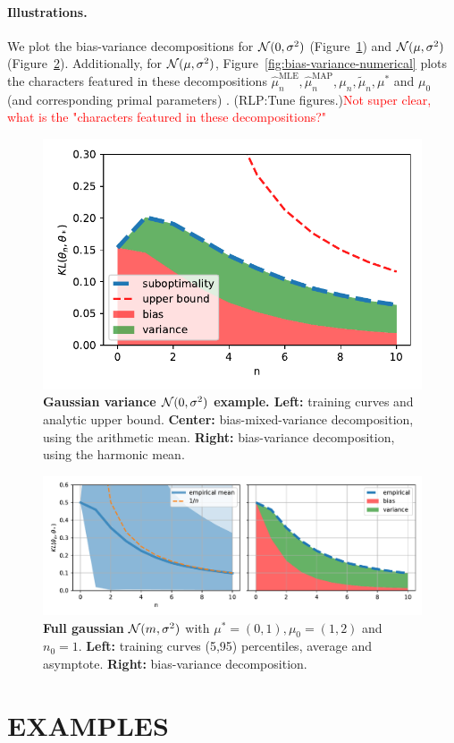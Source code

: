 \documentclass[twoside]{article}
\let\oldsection\section
\renewcommand{\section}[1]{\oldsection{\texorpdfstring{\uppercase{#1}}{#1}}}
\newcommand{\rlp}[1]{\textcolor{BrickRed}{(RLP:#1)}}
\newcommand{\m}{\mu}
\newcommand{\meanp}{\m}
\begin{document}
\paragraph{Illustrations.}
We plot the bias-variance decompositions for ${\mathcal N}(0,\sigma^2)$ (Figure~\ref{fig:variance_decomposition}) and  ${\mathcal N}(\mu, \sigma^2)$ (Figure~\ref{fig:gaussian_decomposition}).
Additionally,  for ${\mathcal N}(\mu, \sigma^2)$, Figure~\ref{fig:bias-variance-numerical} plots the characters featured in these decompositions $\hat \m_n^\text{MLE},\hat \m_n^\text{MAP},\m_n,\tilde \m_n, \m^*$ and $\m_0$ (and corresponding primal parameters) . \rlp{Tune figures.}\textcolor{red}{Not super clear, what is the "characters featured in these decompositions?"}


\begin{figure}[t]
	\centering
	\includegraphics[width=.4\textwidth]{figs/gaussian_variance.pdf}
	\caption{
	\textbf{Gaussian variance ${\mathcal N}(0,\sigma^2)$ example. Left:} training curves and analytic upper bound.
	\textbf{Center:} bias-mixed-variance decomposition, using the arithmetic mean.
	\textbf{Right:} bias-variance decomposition, using the harmonic mean.
	}
	\label{fig:variance_decomposition}
\end{figure}

\begin{figure}[t]
	\centering
	\includegraphics[width=.4\textwidth]{figs/gaussians/new_linear_n0=1.pdf}
	\caption{
	\textbf{Full gaussian} ${\mathcal N}(m, \sigma^2)$ with $\meanp^*=(0, 1), \meanp_0 = (1,2)$ and $n_0=1$. \textbf{Left:} training curves (5,95) percentiles, average and asymptote.
	\textbf{Right:} bias-variance decomposition.
	}
	\label{fig:gaussian_decomposition}
\end{figure}


\section{Examples}\label{sec:example}
\end{document}

